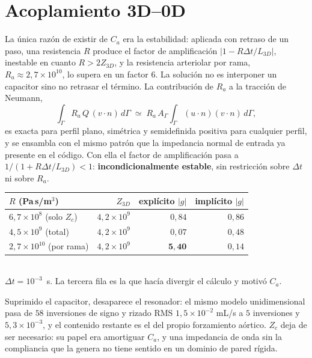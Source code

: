 \documentclass[11pt]{article}
\begin{document}
\section{Acoplamiento 3D--0D}
\label{sec:acopl}

La \'unica raz\'on de existir de $C_a$ era la estabilidad: aplicada con retraso
de un paso, una resistencia $R$ produce el factor de amplificaci\'on
$|1-R\Delta t/L_{3D}|$, inestable en cuanto $R>2Z_{3D}$, y la resistencia
arteriolar por rama, $R_a\approx2{,}7\times10^{10}$, lo supera en un factor
$6$. La soluci\'on no es interponer un capacitor sino no retrasar el t\'ermino.
La contribuci\'on de $R_a$ a la tracci\'on de Neumann,
\begin{equation}
  \int_\Gamma R_a\,Q\,(v\cdot n)\,d\Gamma
  \;\simeq\;
  R_a\,A_\Gamma\int_\Gamma (u\cdot n)(v\cdot n)\,d\Gamma ,
  \label{eq:implicita}
\end{equation}
es exacta para perfil plano, sim\'etrica y semidefinida positiva para cualquier
perfil, y se ensambla con el mismo patr\'on que la impedancia normal de entrada
ya presente en el c\'odigo. Con ella el factor de amplificaci\'on pasa a
$1/(1+R\Delta t/L_{3D})<1$: \textbf{incondicionalmente estable}, sin
restricci\'on sobre $\Delta t$ ni sobre $R_a$.

\begin{center}\small
\begin{tabular}{lrrr}
\toprule
$R$ (Pa\,s/m$^3$) & $Z_{3D}$ & expl\'icito $|g|$ & impl\'icito $|g|$\\
\midrule
$6{,}7\times10^{8}$ (solo $Z_c$)   & $4{,}2\times10^{9}$ & $0{,}84$ & $0{,}86$\\
$4{,}5\times10^{9}$ (total)        & $4{,}2\times10^{9}$ & $0{,}07$ & $0{,}48$\\
$2{,}7\times10^{10}$ (por rama)    & $4{,}2\times10^{9}$ & $\mathbf{5{,}40}$ & $0{,}14$\\
\bottomrule
\end{tabular}\\[2pt]
\footnotesize $\Delta t=10^{-3}$~s. La tercera fila es la que hac\'ia divergir
el c\'alculo y motiv\'o $C_a$.
\end{center}

\noindent
Suprimido el capacitor, desaparece el resonador: el mismo modelo
unidimensional pasa de $58$ inversiones de signo y rizado RMS $1{,}5\times10^{-2}$
mL/s a $5$ inversiones y $5{,}3\times10^{-3}$, y el contenido restante es el del
propio forzamiento a\'ortico. $Z_c$ deja de ser necesario: su papel era
amortiguar $C_a$, y una impedancia de onda sin la compliancia que la genera no
tiene sentido en un dominio de pared r\'igida.
\end{document}
